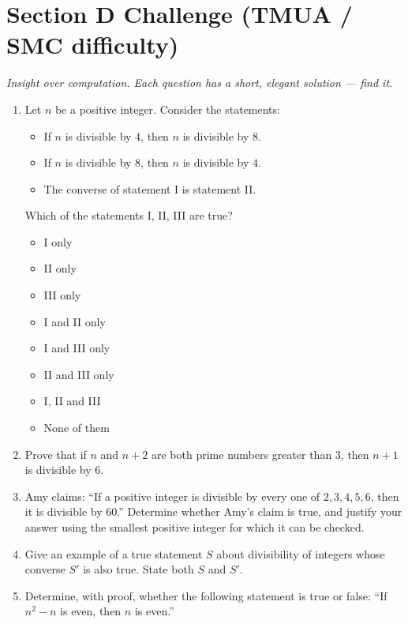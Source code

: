 \documentclass[11pt,a4paper]{article}
\begin{document}
\section*{Section D \quad Challenge \hfill{\normalfont\small(TMUA / SMC difficulty)}}

\noindent\textit{Insight over computation. Each question has a short, elegant solution --- find it.}

\begin{enumerate}

\item Let $n$ be a positive integer. Consider the statements:
\begin{itemize}
\item[I.] If $n$ is divisible by $4$, then $n$ is divisible by $8$.
\item[II.] If $n$ is divisible by $8$, then $n$ is divisible by $4$.
\item[III.] The converse of statement I is statement II.
\end{itemize}
Which of the statements I, II, III are true?
\begin{itemize}
\item[A)] I only
\item[B)] II only
\item[C)] III only
\item[D)] I and II only
\item[E)] I and III only
\item[F)] II and III only
\item[G)] I, II and III
\item[H)] None of them
\end{itemize}

\item Prove that if $n$ and $n+2$ are both prime numbers greater than $3$, then $n+1$ is divisible by $6$.

\item Amy claims: ``If a positive integer is divisible by every one of $2,3,4,5,6$, then it is divisible by $60$.'' Determine whether Amy's claim is true, and justify your answer using the smallest positive integer for which it can be checked.

\item Give an example of a true statement $S$ about divisibility of integers whose converse $S'$ is also true. State both $S$ and $S'$.

\item Determine, with proof, whether the following statement is true or false: ``If $n^2 - n$ is even, then $n$ is even.''

\end{enumerate}

\end{document}
